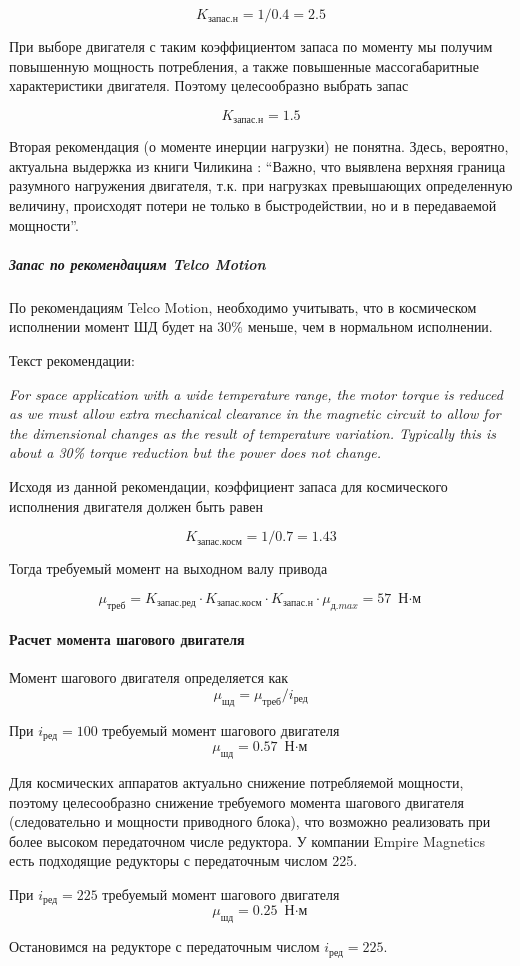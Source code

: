 $$
    K_\textit{запас.н} = 1 / 0.4 = 2.5
$$

При выборе двигателя с таким коэффициентом запаса по моменту мы получим повышенную
мощность потребления, а также повышенные массогабаритные характеристики двигателя.
Поэтому целесообразно выбрать запас

$$
    K_\textit{запас.н} = 1.5
$$

Вторая рекомендация (о моменте инерции нагрузки) не понятна. Здесь, вероятно,
актуальна выдержка из книги Чиликина \cite{Chilikin}: ``Важно, что выявлена верхняя
граница разумного нагружения двигателя, т.к. при нагрузках превышающих определенную
величину, происходят потери не только в быстродействии, но и в передаваемой мощности''.

\subparagraph{Запас по рекомендациям Telco Motion}
По рекомендациям Telco Motion, необходимо учитывать, что в космическом исполнении
момент ШД будет на 30\% меньше, чем в нормальном исполнении.

Текст рекомендации:

\textit{For space application with a wide temperature range, the motor torque is reduced
as we must allow extra mechanical clearance in the magnetic circuit to allow for
the dimensional changes as the result of temperature variation. Typically this
is about a 30\% torque reduction but the power does not change.}

Исходя из данной рекомендации, коэффициент запаса для космического исполнения
двигателя должен быть равен

$$
    K_\textit{запас.косм} = 1 / 0.7 = 1.43
$$

Тогда требуемый момент на выходном валу привода

$$
    \mu_\textit{треб} =
                K_\textit{запас.ред} \cdot K_\textit{запас.косм}
                \cdot K_\textit{запас.н} \cdot \mu_\textit{д.max}
                = 57 \text{ Н$\cdot$м}
$$

\paragraph{Расчет момента шагового двигателя}

Момент шагового двигателя определяется как
\begin{equation}
    \mu_\textit{шд} = \mu_\textit{треб} / i_\text{ред}
    \label{stepper_engine_torque}
\end{equation}


При $i_\text{ред} = 100$ требуемый момент шагового двигателя
$$
    \mu_\textit{шд} = 0.57 \text{ Н$\cdot$м}
$$

Для космических аппаратов актуально снижение потребляемой мощности, поэтому
целесообразно снижение требуемого момента шагового двигателя
(следовательно и мощности приводного блока), что возможно реализовать при более
высоком передаточном числе редуктора. У компании Empire Magnetics есть подходящие
редукторы с передаточным числом 225.

При $i_\text{ред} = 225$ требуемый момент шагового двигателя
$$
    \mu_\textit{шд} = 0.25 \text{ Н$\cdot$м}
$$

Остановимся на редукторе с передаточным числом $i_\text{ред} = 225$.

